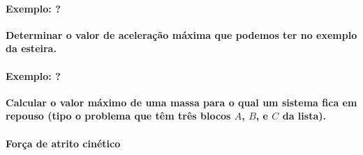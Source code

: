 \paragraph{Exemplo: ?}

\textbf{Determinar o valor de aceleração máxima que podemos ter no exemplo da esteira.}

\paragraph{Exemplo: ?}

\textbf{Calcular o valor máximo de uma massa para o qual um sistema fica em repouso (tipo o problema que têm três blocos $A$, $B$, e $C$ da lista).}

\paragraph{Força de atrito cinético} 

